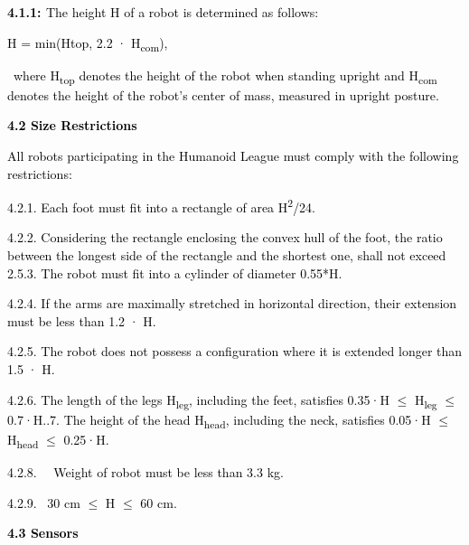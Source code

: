 \documentclass[a4paper]{article}
\begin{document}
\textbf{\textcolor{black}{4.1.1: }}\textcolor{black}{The height H of a robot is determined as follows:}

\textcolor{black}{H = min(Htop, 2.2 \textgreek{· }H}\textcolor{black}{\textsubscript{com}}\textcolor{black}{),}

\textcolor{black}{\ where H}\textcolor{black}{\textsubscript{top }}\textcolor{black}{denotes the height of the robot
when standing upright and H}\textcolor{black}{\textsubscript{com }}\textcolor{black}{denotes the height of the robot's
center of mass, measured in upright posture.}


\bigskip

\textbf{\textcolor{black}{4.2 Size Restrictions}}

\textcolor{black}{All robots participating in the Humanoid League must comply with the following restrictions:}

\textcolor{black}{4.2.1. Each foot must fit into a rectangle of area
H}\textcolor{black}{\textsuperscript{2}}\textcolor{black}{/24.}

\textcolor{black}{4.2.2. Considering the rectangle enclosing the convex hull of the foot, the ratio between the longest
side of the rectangle and the shortest one, shall not exceed 2.5.3. The robot must fit into a cylinder of diameter 0.55*H.}

\textcolor{black}{4.2.4. If the arms are maximally stretched in horizontal direction, their extension must be less than
1.2 \textgreek{· }H.}

\textcolor{black}{4.2.5. The robot does not possess a configuration where it is extended longer than 1.5 \textgreek{·
}H.}

\textcolor{black}{4.2.6. The length of the legs H}\textcolor{black}{\textsubscript{leg}}\textcolor{black}{, including
the feet, satisfies 0.35\textgreek{·}H ${\leq}$ H}\textcolor{black}{\textsubscript{leg }}\textcolor{black}{${\leq}$
0.7\textgreek{·}H..7. The height of the head H}\textcolor{black}{\textsubscript{head}}\textcolor{black}{, including the neck,
satisfies 0.05\textgreek{·}H ${\leq}$ H}\textcolor{black}{\textsubscript{head }}\textcolor{black}{${\leq}$
0.25\textgreek{·}H.}

\textcolor{black}{4.2.8. \ \ Weight of robot must be less than 3.3 kg. }

\textcolor{black}{4.2.9. \ 30 cm ${\leq}$ H ${\leq}$ 60 cm.}

\textbf{\textcolor{black}{4.3 Sensors}}
\end{document}
